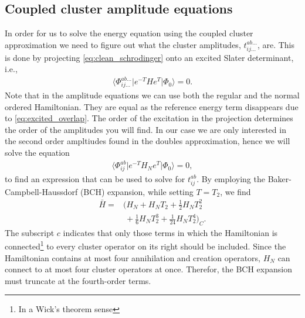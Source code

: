 \documentclass[
    a4paper, aps, twocolumn, floatfix, superscriptaddress,
    nofootinbib]{revtex4-1}
\newcommand{\1}{\mathds{1}}
\newcommand{\bra}[1]{\langle #1\lvert}
\newcommand{\ket}[1]{\rvert #1\rangle}
\newcommand{\kslat}{\ket{\Phi_0}}
\begin{document}
    \subsection{Coupled cluster amplitude equations}
        In order for us to solve the energy equation using the coupled cluster
        approximation we need to figure out what the cluster amplitudes,
        $t_{ij\dots}^{ab\dots}$, are. This is done by projecting
        \autoref{eq:clean_schrodinger} onto an excited Slater determinant, i.e.,
        \begin{align}
            \bra{\Phi_{ij\dots}^{ab\dots}}e^{-T}He^{T}\kslat
            = 0.
        \end{align}
        Note that in the amplitude equations we can use both the regular and the
        normal ordered Hamiltonian. They are equal as the reference energy term
        disappears due to \autoref{eq:excited_overlap}. The order of the
        excitation in the projection determines the order of the amplitudes you
        will find. In our case we are only interested in the second order
        ampltiudes found in the doubles approximation, hence we will solve the
        equation
        \begin{align}
            \bra{\Phi_{ij}^{ab}}e^{-T}H_N e^{T}\kslat = 0,
            \label{eq:doubles_amplitude_1}
        \end{align}
        to find an expression that can be used to solve for $t_{ij}^{ab}$.
        By employing the Baker-Campbell-Haussdorf (BCH) expansion,
        while setting $T= T_2$, we find
        \begin{equation}
        \begin{aligned}
        		\bar{H} 
        			=& \Big(
        					H_N + H_NT_2 
        					+ \frac{1}{2}H_NT_2^2 \\
        				  	&\ + \frac{1}{6}H_NT_2^3 
        				   + \frac{1}{24} H_NT_2^4
        				 \Big)_C.
        \end{aligned}
        \label{eq:normal_order_expansion}
        \end{equation}
		The subscript $c$ indicates that only those terms in which the 
		Hamiltonian is connected\footnote{In a Wick's theorem sense}
		to every cluster operator on its right should be included. Since
		the Hamiltonian contains at most four annihilation and creation 
		operators, $H_N$ can connect to at most four cluster operators
		at once. Therefor, the BCH expansion must truncate at the
		fourth-order terms. 
		
\end{document}
